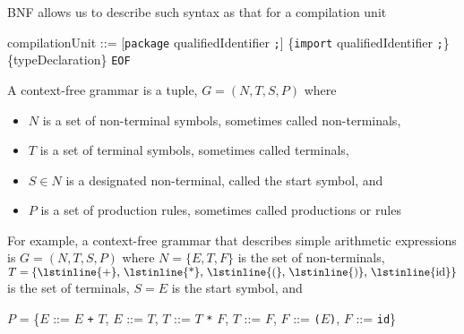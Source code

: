 \documentclass[8pt,a4paper,compress,handout]{beamer}
\newcommand{\mm}[1]{$#1$}
\newenvironment{spaced}
{
\smallskip
\hspace{.5cm}
\begin{minipage}[c]{\textwidth}
}
{
\end{minipage}
\smallskip
}
\begin{document}
\begin{frame}[fragile]
\pause

BNF allows us to describe such syntax as that for a \jmm compilation unit

\text{ }
\begin{spaced}
\begin{production}
compilationUnit ::= [\lstinline{package} qualifiedIdentifier \lstinline{;}]
                           \{\lstinline{import}  qualifiedIdentifier \lstinline{;}\}
                           \{typeDeclaration\} \lstinline{EOF}
\end{production}
\end{spaced}

\pause
\bigskip

A context-free grammar is a tuple, $G = (N,T,S,P)$ where 
\begin{itemize}
\item $N$ is a set of non-terminal symbols, sometimes called non-terminals, 
\item $T$ is a set of terminal symbols, sometimes called terminals,
\item $S \in N$ is a designated non-terminal, called the start symbol, and
\item $P$ is a set of production rules, sometimes called productions or rules
\end{itemize}

\pause
\bigskip

For example, a context-free grammar that describes simple arithmetic expressions is $G = (N, T, S, P)$ where $N = \{E, T, F\}$ is the set of non-terminals, $T = \{\text{\lstinline{+}, \lstinline{*}, \lstinline{(}, \lstinline{)}, \lstinline{id}}\}$ is the set of terminals, $S = E$ is the start symbol, and

\text{ }
\begin{spaced}
\begin{production}
\mm{P} = \{\mm{E} ::= \mm{E} \lstinline{+} \mm{T},
        \mm{E} ::= \mm{T},
        \mm{T} ::= \mm{T} \lstinline{*} \mm{F},
        \mm{T} ::= \mm{F},
        \mm{F} ::= \lstinline{(}\mm{E}\lstinline{)},
        \mm{F} ::= \lstinline{id}\}
\end{production}
\end{spaced}
\end{frame}
\end{document}
